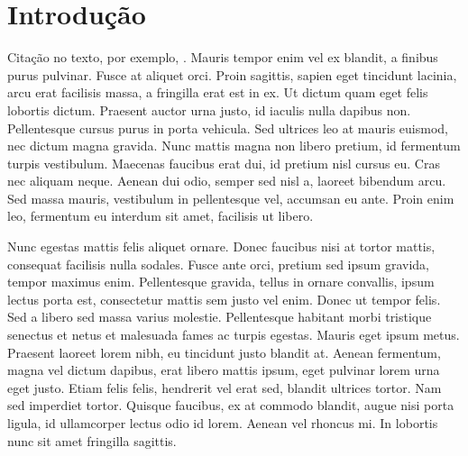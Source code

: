 \documentclass[book,A4paper,10pt,twoside,oldfontcommands]{memoir}\usepackage[]{graphicx}\usepackage[usenames,dvipsnames]{color}
\begin{document}

\openright




\chapter{Introdução}

Citação no texto, por exemplo, \citet{Cockerham1996}. Mauris tempor
enim vel ex blandit, a finibus purus pulvinar. Fusce at aliquet orci.
Proin sagittis, sapien eget tincidunt lacinia, arcu erat facilisis
massa, a fringilla erat est in ex. Ut dictum quam eget felis lobortis
dictum. Praesent auctor urna justo, id iaculis nulla dapibus non.
Pellentesque cursus purus in porta vehicula. Sed ultrices leo at
mauris euismod, nec dictum magna gravida. Nunc mattis magna non libero
pretium, id fermentum turpis vestibulum. Maecenas faucibus erat dui,
id pretium nisl cursus eu. Cras nec aliquam neque. Aenean dui odio,
semper sed nisl a, laoreet bibendum arcu. Sed massa mauris, vestibulum
in pellentesque vel, accumsan eu ante. Proin enim leo, fermentum eu
interdum sit amet, facilisis ut libero.

Nunc egestas mattis felis aliquet ornare. Donec faucibus nisi at
tortor mattis, consequat facilisis nulla sodales. Fusce ante orci,
pretium sed ipsum gravida, tempor maximus enim. Pellentesque gravida,
tellus in ornare convallis, ipsum lectus porta est, consectetur mattis
sem justo vel enim. Donec ut tempor felis. Sed a libero sed massa
varius molestie. Pellentesque habitant morbi tristique senectus et
netus et malesuada fames ac turpis egestas. Mauris eget ipsum metus.
Praesent laoreet lorem nibh, eu tincidunt justo blandit at. Aenean
fermentum, magna vel dictum dapibus, erat libero mattis ipsum, eget
pulvinar lorem urna eget justo. Etiam felis felis, hendrerit vel erat
sed, blandit ultrices tortor. Nam sed imperdiet tortor. Quisque
faucibus, ex at commodo blandit, augue nisi porta ligula, id
ullamcorper lectus odio id lorem. Aenean vel rhoncus mi. In lobortis
nunc sit amet fringilla sagittis. 
\end{document}
